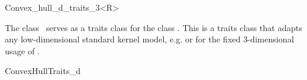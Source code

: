 
\ccAutoIndexingOff
\begin{ccRefClass}{Convex_hull_d_traits_3<R>} 
\ccAutoIndexingOn
{}

\ccDefinition
  
The class \ccRefName\ serves as a traits class for the class
.  This is a traits class that adapts any
low-dimensional standard kernel model, e.g.  or
 for the fixed 3-dimensional usage of
.



\ccIsModel

ConvexHullTraits\_d

\ccCreation
{}  %



\ccAutoIndexingOff
\end{ccRefClass}
\ccAutoIndexingOn


